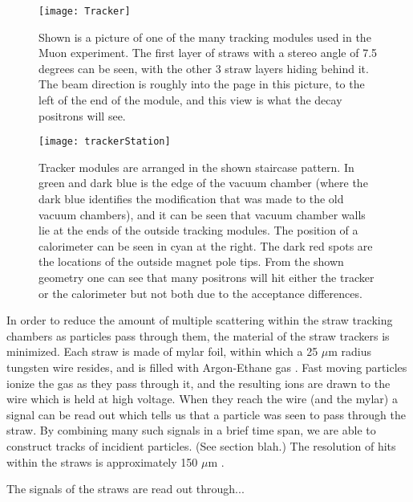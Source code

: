 \begin{figure}[]
    \caption[Tracker module]{Shown is a picture of one of the many tracking modules used in the Muon \gmtwo experiment. The first layer of straws with a stereo angle of 7.5 degrees can be seen, with the other 3 straw layers hiding behind it. The beam direction is roughly into the page in this picture, to the left of the end of the module, and this view is what the decay positrons will see.}
    \centering
    \texttt{[image: Tracker]}
    \label{fig:tracker}
\end{figure}

\begin{figure}[]
    \caption[Tracker module arrangement]{Tracker modules are arranged in the shown staircase pattern. In green and dark blue is the edge of the vacuum chamber (where the dark blue identifies the modification that was made to the old vacuum chambers), and it can be seen that vacuum chamber walls lie at the ends of the outside tracking modules. The position of a calorimeter can be seen in cyan at the right. The dark red spots are the locations of the outside magnet pole tips. From the shown geometry one can see that many positrons will hit either the tracker or the calorimeter but not both due to the acceptance differences.}
    \centering
    \texttt{[image: trackerStation]}
    \label{fig:staircase}
\end{figure}

In order to reduce the amount of multiple scattering within the straw tracking chambers as particles pass through them, the material of the straw trackers is minimized. Each straw is made of mylar foil, within which a 25 $\mu$m radius tungsten wire resides, and is filled with Argon-Ethane gas \cite{something}. Fast moving particles ionize the gas as they pass through it, and the resulting ions are drawn to the wire which is held at high voltage. When they reach the wire (and the mylar) a signal can be read out which tells us that a particle was seen to pass through the straw. By combining many such signals in a brief time span, we are able to construct tracks of incidient particles. (See section blah.) The resolution of hits within the straws is approximately 150 $\mu$m \cite{something}.

The signals of the straws are read out through...


